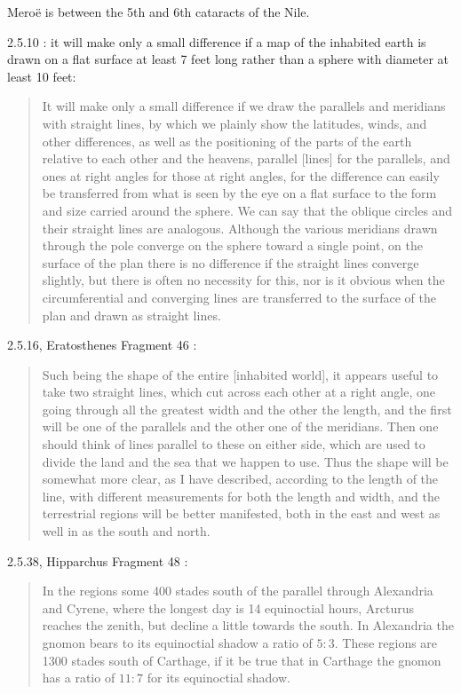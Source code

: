 \documentclass{amsart}
\theoremstyle{definition}
\begin{document}
Mero\"e is between the 5th and 6th cataracts of the Nile. 


2.5.10  \cite[p.~134]{strabo}: it will make only a small difference if a map of the inhabited earth is drawn on a flat surface at least 7 feet long rather than a sphere with diameter at least 10 feet:

\begin{quote}
It will make only a small difference if we draw the parallels and meridians with straight lines, by which we plainly show the latitudes, winds, and other differences, as well
as the positioning of the parts of the earth relative to each other and the heavens, parallel [lines] for the parallels, and ones at right angles for those at right
angles, for the difference can easily be transferred from what is seen by the eye on a flat surface to the form and size carried around the sphere. We can say that the oblique
circles and their straight lines are analogous. Although the various meridians drawn through the pole converge on the sphere toward a single point, on the surface of the plan
there is no difference if the straight lines converge slightly, but there is often no necessity for this, nor is it obvious when the circumferential and converging lines are 
transferred to the surface of the plan and drawn as straight lines.
\end{quote}

2.5.16, Eratosthenes Fragment 46 \cite[p.~69]{eratosthenes}:

\begin{quote}
Such being the shape of the entire [inhabited world], it appears useful
to take two straight lines, which cut across each other at a right angle,
one going through all the greatest width and the other the length, and
the first will be one of the parallels and the other one of the meridians.
Then one should think of lines parallel to these on either side, which are
used to divide the land and the sea that we happen to use. Thus the
shape will be somewhat more clear, as I have described, according to the
length of the line, with different measurements for both the length and
width, and the terrestrial regions will be better manifested, both in the
east and west as well in as the south and north.
\end{quote}

2.5.38, Hipparchus Fragment 48 \cite[p.~95]{dicks}:

\begin{quote}
In the regions some 400 stades south of the parallel through
Alexandria and Cyrene, where the longest day is 14 equinoctial
hours, Arcturus reaches the zenith, but decline a little towards
the south. In Alexandria the gnomon bears to its equinoctial
shadow a ratio of $5:3$. These regions are 1300 stades south of
Carthage, if it be true that in Carthage the gnomon has a ratio
of $11:7$ for its equinoctial shadow.
\end{quote}
\end{document}
